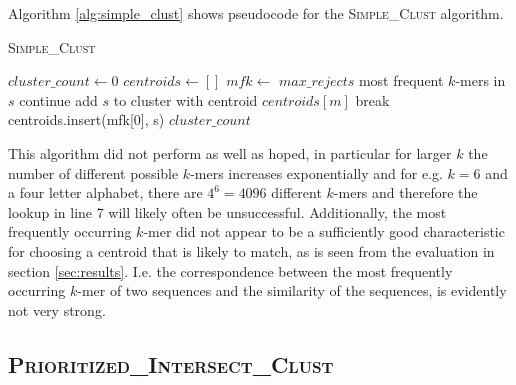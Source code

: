 
Algorithm \ref{alg:simple_clust} shows pseudocode for the
\textsc{Simple\_Clust} algorithm.

\begin{algorithm}
  \caption{\textsc{Simple\_Clust}}
  \label{alg:simple_clust}
  \begin{algorithmic}[1]
    \Statex
      \State $cluster\_count \gets 0$
      \State $centroids \gets []$ 
        \State $mfk \gets$ $max\_rejects$ most frequent $k$-mers in $s$
            \State continue
            \State add $s$ to cluster with centroid $centroids[m]$
            \State break
          \EndIf
        \EndFor
          \State centroids.insert(mfk[0], s)
        \EndIf
      \EndFor
      \State \Return $cluster\_count$
    \EndFunction
  \end{algorithmic}
\end{algorithm}


This algorithm did not perform as well as hoped, in particular for larger $k$
the number of different possible $k$-mers increases exponentially and for e.g.
$k = 6$ and a four letter alphabet, there are $4^6 = 4096$ different $k$-mers
and therefore the lookup in line 7 will likely often be unsuccessful.
Additionally, the most frequently occurring $k$-mer did not appear to be a
sufficiently good characteristic for choosing a centroid that is likely to
match, as is seen from the evaluation in section \ref{sec:results}. I.e. the
correspondence between the most frequently occurring $k$-mer of two sequences
and the similarity of the sequences, is evidently not very strong.  %


\subsection{\textsc{Prioritized\_Intersect\_Clust}}

